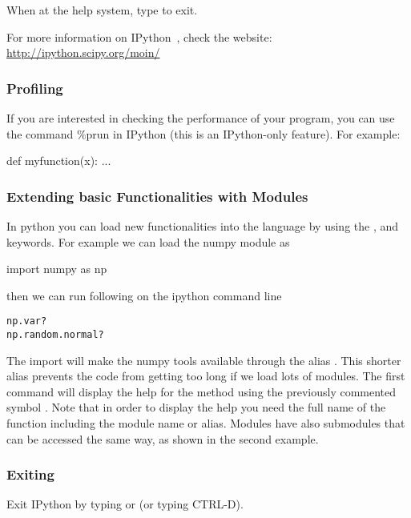 When at the help system, type  to exit.

For more information on IPython~\citep{PER-GRA:2007}, check the website: \url{http://ipython.scipy.org/moin/}


\subsubsection{Profiling}


If you are interested in checking the performance of your program, you can use the
command \%prun in IPython (this is an IPython-only feature). For example:


\begin{python}
def myfunction(x):
    ...

\end{python}

\subsubsection{Extending basic Functionalities with Modules}

In python you can load new functionalities into the language by using the ,  and  keywords. For example we can load the numpy module as

\begin{python}
import numpy as np
\end{python}

then we can run following on the ipython command line

\begin{verbatim}
np.var?
np.random.normal?
\end{verbatim}

The import  will make the numpy tools available through the alias . This shorter alias prevents the code from getting too long if we load lots of modules. The first command will display the help for the method  using the previously commented symbol . Note that in order to display the help you need the full name of the function including the module name or alias. Modules have also submodules that can be accessed the same way, as shown in the second example.

\subsubsection{Exiting}

Exit IPython by typing  or  (or typing CTRL-D).


